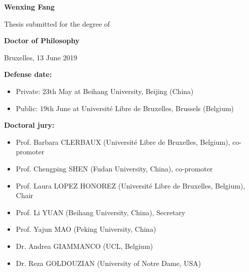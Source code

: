 \begin{titlepage}
\begin{center}
\begin{Large}
        \textbf{Wenxing Fang}
        \vspace*{1.5cm}

        Thesis submitted for the degree of
        \vspace*{0.5cm}

        \textbf{Doctor of Philosophy} \\
        \end{Large}


        \vspace{1.8cm}

        Bruxelles, 13 June 2019


    \end{center}
\afterpage{\blankpage}
\end{titlepage}



\newpage
\afterpage{\blankpage}
\thispagestyle{empty}
\begin{Large}
\textbf{Defense date:}
\end{Large}
\begin{itemize}
\item{Private: 23th May at Beihang University, Beijing (China)}
\item{Public: 19th June at Universit\'e Libre de Bruxelles, Brussels (Belgium)}
\end{itemize}
\medskip

\begin{Large}
\textbf{Doctoral jury:}
\end{Large}
\begin{itemize}
\item{Prof. Barbara CLERBAUX (Universit\'e Libre de Bruxelles, Belgium), co-promoter}
\item{Prof. Chengping SHEN (Fudan University, China), co-promoter}
\item{Prof. Laura LOPEZ HONOREZ (Universit\'e Libre de Bruxelles, Belgium), Chair}
\item{Prof. Li YUAN (Beihang University, China), Secretary}
\item{Prof. Yajun MAO (Peking University, China)}
\item{Dr. Andrea GIAMMANCO (UCL, Belgium)}
\item{Dr. Reza GOLDOUZIAN (University of Notre Dame, USA)}
\end{itemize}
\medskip


